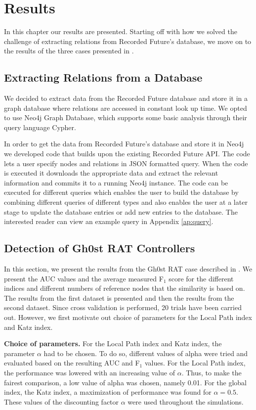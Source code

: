 \chapter{Results}
In this chapter our results are presented. Starting off with how we solved the challenge of extracting relations from Recorded Future's database, we move on to the results of the three cases presented in . 

\section{Extracting Relations from a Database}
We decided to extract data from the Recorded Future database and store it in a graph database where relations are accessed in constant look up time. We opted to use Neo4j Graph Database, which supports some basic analysis through their query language Cypher. 

In order to get the data from Recorded Future's database and store it in Neo4j we developed code that builds upon the existing Recorded Future API. The code lets a user specify nodes and relations in JSON formatted query. When the code is executed it downloads the appropriate data and extract the relevant information and commits it to a running Neo4j instance. The code can be executed for different queries which enables the user to build the database by combining different queries of different types and also enables the user at a later stage to update the database entries or add  new entries to the database. The interested reader can view an example query in Appendix \ref{ap:query}. 

\section{Detection of Gh0st RAT Controllers}
In this section, we present the results from the Gh0st RAT case described in . We present the AUC values and the average measured F$_1$ score for the different indices and different numbers of reference nodes that the similarity is based on. The results from the first dataset is presented and then the results from the second dataset. Since cross validation is performed, 20 trials have been carried out. However, we first motivate out choice of parameters for the Local Path index and Katz index.

\textbf{Choice of parameters.} For the Local Path index and Katz index,  the parameter $\alpha$ had to be chosen. To do so, different values of alpha were tried and evaluated based on the resulting AUC and F$_1$ values. For the Local Path index, the performance was lowered with an increasing value of $\alpha$. Thus, to make the fairest comparison, a low value of alpha was chosen, namely 0.01. For the global index, the Katz index, a maximization of performance was found for $\alpha=0.5$. These values of the discounting factor $\alpha$ were used throughout the simulations. 

